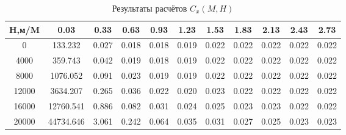 \begin{table}[H]
\centering
\caption{Результаты расчётов $C_x(M,H)$}
\label{Cx}
\begin{tabular}{|c|c|c|c|c|c|c|c|c|c|c|}
\toprule
H,м/M &       0.03 &   0.33 &   0.63 &   0.93 &   1.23 &   1.53 &   1.83 &   2.13 &   2.43 &   2.73 \\
\midrule
0     &    133.232 &  0.027 &  0.018 &  0.018 &  0.019 &  0.022 &  0.022 &  0.022 &  0.022 &  0.022 \\
4000  &    359.743 &  0.042 &  0.019 &  0.018 &  0.019 &  0.022 &  0.022 &  0.022 &  0.022 &  0.022 \\
8000  &   1076.052 &  0.091 &  0.023 &  0.019 &  0.019 &  0.022 &  0.022 &  0.022 &  0.022 &  0.022 \\
12000 &   3634.207 &  0.265 &  0.036 &  0.022 &  0.020 &  0.023 &  0.022 &  0.022 &  0.022 &  0.022 \\
16000 &  12760.541 &  0.886 &  0.082 &  0.031 &  0.024 &  0.025 &  0.023 &  0.023 &  0.022 &  0.022 \\
20000 &  44734.646 &  3.061 &  0.242 &  0.064 &  0.035 &  0.031 &  0.027 &  0.025 &  0.023 &  0.023 \\
\bottomrule
\end{tabular}
\end{table}
